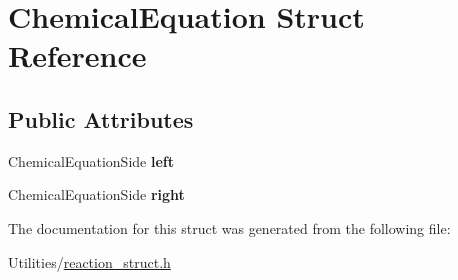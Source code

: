 \hypertarget{struct_chemical_equation}{}\section{Chemical\+Equation Struct Reference}
\label{struct_chemical_equation}
\subsection*{Public Attributes}
\begin{DoxyCompactItemize}
\item 
\mbox{\label{struct_chemical_equation_a33bea56310fa4e8d97bb4e5752151c27}} 
Chemical\+Equation\+Side {\bfseries left}
\item 
\mbox{\label{struct_chemical_equation_a40f619b763ce83ec40f3ce2946ba1f4f}} 
Chemical\+Equation\+Side {\bfseries right}
\end{DoxyCompactItemize}


The documentation for this struct was generated from the following file\+:\begin{DoxyCompactItemize}
\item 
Utilities/\mbox{\hyperlink{reaction__struct_8h}{reaction\+\_\+struct.\+h}}\end{DoxyCompactItemize}
